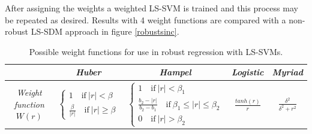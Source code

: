 \par After assigning the weights a weighted LS-SVM is trained and this process may be repeated as desired. Results with 4 weight functions are compared with a non-robust LS-SDM approach in figure \ref{robustsinc}.
\vspace{0.4cm}
\begin{table}[h]
\centering
\begin{tabular}{c|cccc}
& \textit{Huber} & \textit{Hampel} & \textit{Logistic} & \textit{Myriad}\\
\hline
\textit{Weight function} $W(r)$ & $\begin{cases}1\quad\text{if}\ |r|<\beta\\\frac{\beta}{|r|}\quad\text{if}\ |r|\geq\beta\end{cases}$ & $\begin{cases}1\quad\text{if}\ |r|<\beta_1\\\frac{b_2-|r|}{b_2-b_1}\quad\text{if}\ \beta_1\leq|r|\leq\beta_2\\0\quad\text{if}\ |r|>\beta_2\end{cases}$ & $\frac{tanh(r)}{r}$ & $\frac{\delta^2}{\delta^2+r^2}$\\
\end{tabular}
\caption{Possible weight functions for use in robust regression with LS-SVMs.}
\label{roburegwf}
\end{table}

